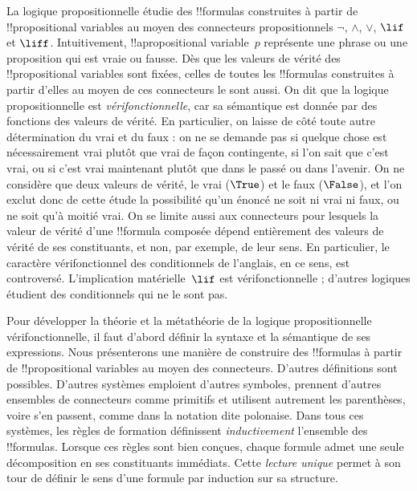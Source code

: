 \documentclass[../../../include/open-logic-section]{subfiles}
\begin{document}


La logique propositionnelle étudie des !!{formula}s construites à partir
de !!{propositional variable}s au moyen des connecteurs propositionnels
$\lnot$, $\land$, $\lor$, $\lif$ et $\liff$. Intuitivement,
!!a{propositional variable}~$p$ représente une phrase ou une proposition
qui est vraie ou fausse. Dès que les valeurs de vérité des
!!{propositional variable}s sont fixées, celles de toutes les !!{formula}s
construites à partir d'elles au moyen de ces connecteurs le sont aussi.
On dit que la logique propositionnelle est \emph{vérifonctionnelle},
car sa sémantique est donnée par des fonctions des valeurs de vérité.
En particulier, on laisse de côté toute autre détermination du vrai
et du faux : on ne se demande pas si quelque chose est nécessairement
vrai plutôt que vrai de façon contingente, si l'on sait que c'est vrai,
ou si c'est vrai maintenant plutôt que dans le passé ou dans l'avenir.
On ne considère que deux valeurs de vérité, le vrai ($\True$) et le faux
($\False$), et l'on exclut donc de cette étude la possibilité qu'un
énoncé ne soit ni vrai ni faux, ou ne soit qu'à moitié vrai. On se
limite aussi aux connecteurs pour lesquels la valeur de vérité d'une
!!{formula} composée dépend entièrement des valeurs de vérité de ses
constituants, et non, par exemple, de leur sens. En particulier, le
caractère vérifonctionnel des conditionnels de l'anglais, en ce sens,
est controversé. L'implication matérielle~$\lif$ est vérifonctionnelle ;
d'autres logiques étudient des conditionnels qui ne le sont pas.

Pour développer la théorie et la métathéorie de la logique
propositionnelle vérifonctionnelle, il faut d'abord définir la syntaxe
et la sémantique de ses expressions. Nous présenterons une manière de
construire des !!{formula}s à partir de !!{propositional variable}s au
moyen des connecteurs. D'autres définitions sont possibles. D'autres
systèmes emploient d'autres symboles, prennent d'autres ensembles de
connecteurs comme primitifs et utilisent autrement les parenthèses,
voire s'en passent, comme dans la notation dite polonaise. Dans tous
ces systèmes, les règles de formation définissent \emph{inductivement}
l'ensemble des !!{formula}s. Lorsque ces règles sont bien conçues,
chaque formule admet une seule décomposition en ses constituants
immédiats. Cette \emph{lecture unique} permet à son tour de définir
le sens d'une formule par induction sur sa structure.
%
\end{document}
